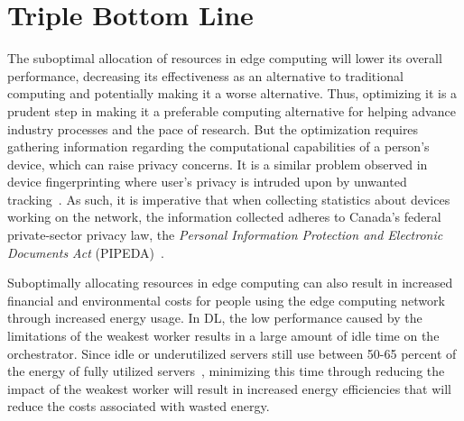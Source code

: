\documentclass[../mthe-493-project-proposal.tex]{subfiles}
\begin{document}
    \section{Triple Bottom Line}
    The suboptimal allocation of resources in edge computing will lower its overall performance, decreasing its effectiveness as an alternative to traditional computing and potentially making it a worse alternative. Thus, optimizing it is a prudent step in making it a preferable computing alternative for helping advance industry processes and the pace of research. But the optimization requires gathering information regarding the computational capabilities of a person's device, which can raise privacy concerns. It is a similar problem observed in device fingerprinting where user's privacy is intruded upon by unwanted tracking~\cite{laperdrix_browser_2020}. As such, it is imperative that when collecting statistics about devices working on the network, the information collected adheres to Canada’s federal private-sector privacy law, the \textit{Personal Information Protection and Electronic Documents Act} (PIPEDA)~\cite{noauthor_privacy_nodate}.

    Suboptimally allocating resources in edge computing can also result in increased financial and environmental costs for people using the edge computing network through increased energy usage. In DL, the low performance caused by the limitations of the weakest worker results in a large amount of idle time on the orchestrator. Since idle or underutilized servers still use between 50-65 percent of the energy of fully utilized servers~\cite{noauthor_triple_nodate}, minimizing this time through reducing the impact of the weakest worker will result in increased energy efficiencies that will reduce the costs associated with wasted energy.
\end{document}
